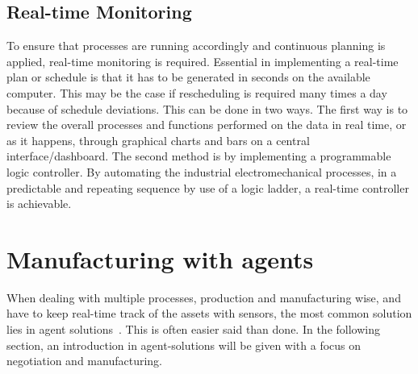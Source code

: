 %




\subsection{Real-time Monitoring}
To ensure that processes are running accordingly and continuous planning is applied, real-time monitoring is required. Essential in implementing a real-time plan or schedule is that it has to be generated in seconds on the available computer. This may be the case if rescheduling is required many times a day because of schedule deviations. This can be done in two ways. The first way is to review the overall processes and functions performed on the data in real time, or as it happens, through graphical charts and bars on a central interface/dashboard. The second method is by implementing a programmable logic controller. By automating the industrial electromechanical processes, in a predictable and repeating sequence by use of a logic ladder, a real-time controller is achievable. 

\section*{Manufacturing with agents}
When dealing with multiple processes, production and manufacturing wise, and have to keep real-time track of the assets with sensors, the most common solution lies in agent solutions~\cite{leitao2013past, monostori2016cyber}. This is often easier said than done. In the following section, an introduction in agent-solutions will be given with a focus on negotiation and manufacturing.
%
%
%
%
\newpage
